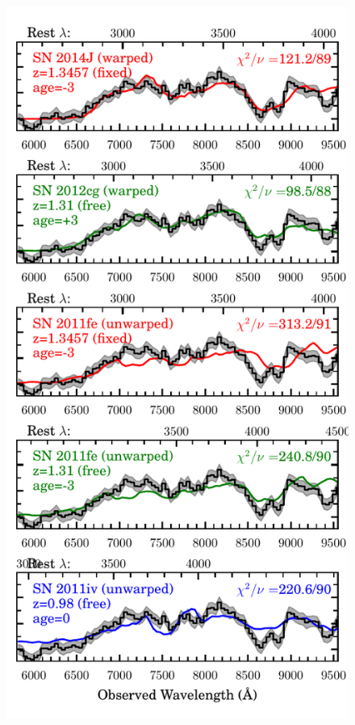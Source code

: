 \documentclass[iop]{emulateapj}
\begin{document}
\begin{figure}
\begin{center}
\includegraphics[width=\columnwidth]{specfit}
\caption{  \label{fig:SpecFit}
}
\end{center}
\end{figure}
\end{document}
